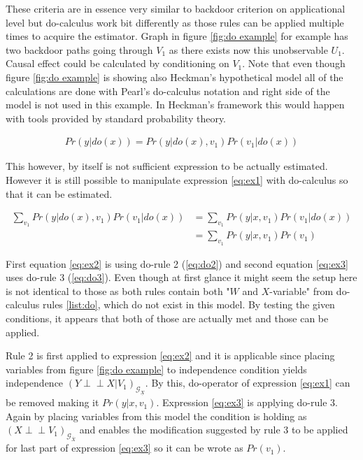 \documentclass[main=english,12pt,a4paper,pdftex,econ,utf8]{aaltothesis}
\newcommand{\indep}{\perp \!\!\! \perp}
\newcommand{\g}{\mathcal{G}}
\begin{document}
These criteria are in essence very similar to backdoor criterion on applicational level but do-calculus work bit differently as those rules can be applied multiple times to acquire the estimator. Graph in figure \ref{fig:do example} for example has two backdoor paths going through $V_{1}$ as there exists now this unobservable $U_1$. Causal effect could be calculated by conditioning on $V_1$. Note that even though figure \ref{fig:do example} is showing also Heckman's hypothetical model all of the calculations are done with Pearl's do-calculus notation and right side of the model is not used in this example. In Heckman's framework this would happen with tools provided by standard probability theory.



\begin{gather}
    Pr(y|do(x))=Pr(y|do(x),v_1)Pr(v_1|do(x)) \label{eq:ex1}
\end{gather}

\noindent This however, by itself is not sufficient expression to be actually estimated. However it is still possible to manipulate expression \ref{eq:ex1}  with do-calculus so that it can be estimated.

\begin{align}
    \sum_{v_1}Pr(y|do(x), v_1)Pr(v_1|do(x))&=\sum_{v_1}Pr(y|x, v_1)Pr(v_1|do(x)) \label{eq:ex2} \\
    &=\sum_{v_1}Pr(y|x, v_1)Pr(v_1) \label{eq:ex3}
\end{align}

First equation \ref{eq:ex2} is using do-rule 2 (\ref{eq:do2}) and second equation \ref{eq:ex3} uses do-rule 3 (\ref{eq:do3}). Even though at first glance it might seem the setup here is not identical to those as both rules contain both "$W$ and $X$-variable" from do-calculus rules \ref{list:do}, which do not exist in this model. By testing the given conditions, it appears that both of those are actually met and those can be applied.

Rule 2 is first applied to expression \ref{eq:ex2} and it is applicable since placing variables from figure \ref{fig:do example} to independence condition yields independence $(Y \indep X|V_{1})_{\g_{\underline{X}}}$. By this, do-operator of expression \ref{eq:ex1} can be removed making it $Pr(y|x,v_1)$. Expression \ref{eq:ex3} is applying do-rule 3. Again by placing variables from this model the condition is holding as $(X\indep V_{1})_{\g_{\overline{X}}}$ and enables the modification suggested by rule 3 to be applied for last part of expression \ref{eq:ex3} so it can be wrote as $Pr(v_{1})$.
\end{document}
